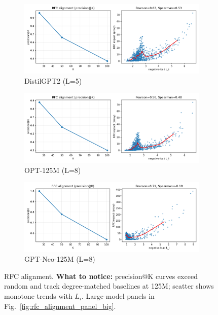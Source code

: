 \documentclass[11pt]{article}
\newcommand{\1}{\mathbf{1}}
\begin{document}
\begin{figure}[t]
\centering
\begin{subfigure}[t]{0.32\textwidth}
\includegraphics[width=\linewidth]{figs/rfc_alignment_distilgpt2_residual_L5}
\caption{DistilGPT2 (L=5)}
\end{subfigure}\hfill
\begin{subfigure}[t]{0.32\textwidth}
\includegraphics[width=\linewidth]{figs/rfc_alignment_facebook_opt-125m_residual_L8}
\caption{OPT-125M (L=8)}
\end{subfigure}\hfill
\begin{subfigure}[t]{0.32\textwidth}
\includegraphics[width=\linewidth]{figs/rfc_alignment_EleutherAI_gpt-neo-125M_residual_L8}
\caption{GPT-Neo-125M (L=8)}
\end{subfigure}
\caption{RFC alignment. \textbf{What to notice:} precision@K curves exceed random and track degree-matched baselines at 125M; scatter shows monotone trends with $L_i$. Large-model panels in Fig.~\ref{fig:rfc_alignment_panel_big}.}
\label{fig:rfc_alignment_panel}
\end{figure}
\end{document}
